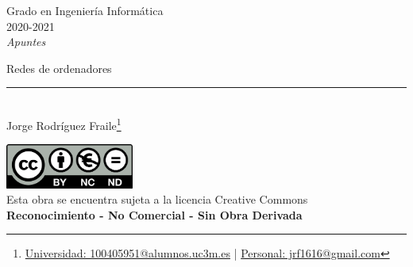 \documentclass[12pt, twoside, openright]{report} %
\begin{document}

\begin{titlepage}
	\begin{sffamily}
		\color{azulUC3M}
		\begin{center}
			\begin{figure}[H] %
			\end{figure}
			\vspace{2.5cm}
			\begin{Large}
				Grado en Ingeniería Informática\\
				2020-2021\\
				\vspace{2cm}
				\textsl{Apuntes}\\
				\bigskip
			\end{Large}
			{\Huge Redes de ordenadores}\\
			\vspace*{0.5cm}
			\rule{10.5cm}{0.1mm}\\
			\vspace*{0.9cm}
			{\LARGE Jorge Rodríguez Fraile\footnote{\href{mailto:100405951@alumnos.uc3m.es}{Universidad: 100405951@alumnos.uc3m.es}  |  \href{mailto:jrf1616@gmail.com}{Personal: jrf1616@gmail.com}}}\\
			\vspace*{1cm}
		\end{center}
		\vfill
		\color{black}
		\includegraphics[width=4.2cm]{img/creativecommons.png}\\
		Esta obra se encuentra sujeta a la licencia Creative Commons\\ \textbf{Reconocimiento - No Comercial - Sin Obra Derivada}
	\end{sffamily}
\end{titlepage}


\tableofcontents
\thispagestyle{fancy}
\end{document}

